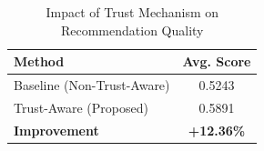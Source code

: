 \begin{table}[h]
\centering
\caption{Impact of Trust Mechanism on Recommendation Quality}
\label{tab:trust}
\begin{tabular}{lc}
\toprule
\textbf{Method} & \textbf{Avg. Score} \\
\midrule
Baseline (Non-Trust-Aware) & 0.5243 \\
Trust-Aware (Proposed) & 0.5891 \\
\midrule
\textbf{Improvement} & \textbf{+12.36\%} \\
\bottomrule
\end{tabular}
\end{table}
